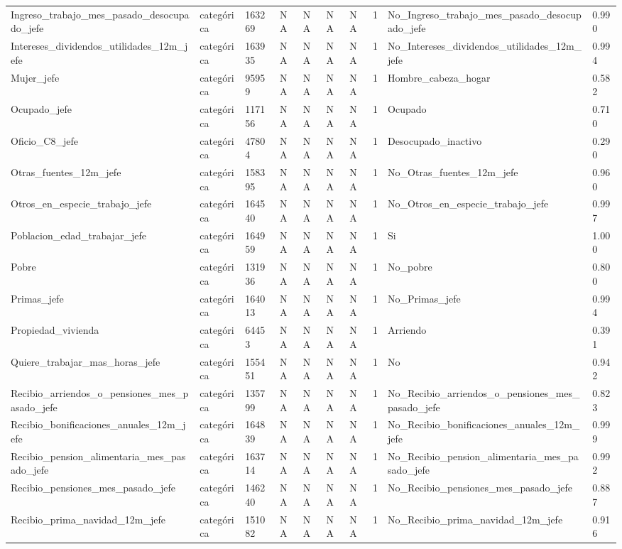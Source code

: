 \begin{longtable}[t]{llllllllll}
Ingreso\_trabajo\_mes\_pasado\_desocupado\_jefe & categórica & 163269 & NA & NA & NA & NA & 1 & No\_Ingreso\_trabajo\_mes\_pasado\_desocupado\_jefe & 0.990\\
Intereses\_dividendos\_utilidades\_12m\_jefe & categórica & 163935 & NA & NA & NA & NA & 1 & No\_Intereses\_dividendos\_utilidades\_12m\_jefe & 0.994\\
Mujer\_jefe & categórica & 95959 & NA & NA & NA & NA & 1 & Hombre\_cabeza\_hogar & 0.582\\
Ocupado\_jefe & categórica & 117156 & NA & NA & NA & NA & 1 & Ocupado & 0.710\\
Oficio\_C8\_jefe & categórica & 47804 & NA & NA & NA & NA & 1 & Desocupado\_inactivo & 0.290\\
Otras\_fuentes\_12m\_jefe & categórica & 158395 & NA & NA & NA & NA & 1 & No\_Otras\_fuentes\_12m\_jefe & 0.960\\
Otros\_en\_especie\_trabajo\_jefe & categórica & 164540 & NA & NA & NA & NA & 1 & No\_Otros\_en\_especie\_trabajo\_jefe & 0.997\\
Poblacion\_edad\_trabajar\_jefe & categórica & 164959 & NA & NA & NA & NA & 1 & Si & 1.000\\
Pobre & categórica & 131936 & NA & NA & NA & NA & 1 & No\_pobre & 0.800\\
Primas\_jefe & categórica & 164013 & NA & NA & NA & NA & 1 & No\_Primas\_jefe & 0.994\\
Propiedad\_vivienda & categórica & 64453 & NA & NA & NA & NA & 1 & Arriendo & 0.391\\
Quiere\_trabajar\_mas\_horas\_jefe & categórica & 155451 & NA & NA & NA & NA & 1 & No & 0.942\\
Recibio\_arriendos\_o\_pensiones\_mes\_pasado\_jefe & categórica & 135799 & NA & NA & NA & NA & 1 & No\_Recibio\_arriendos\_o\_pensiones\_mes\_pasado\_jefe & 0.823\\
Recibio\_bonificaciones\_anuales\_12m\_jefe & categórica & 164839 & NA & NA & NA & NA & 1 & No\_Recibio\_bonificaciones\_anuales\_12m\_jefe & 0.999\\
Recibio\_pension\_alimentaria\_mes\_pasado\_jefe & categórica & 163714 & NA & NA & NA & NA & 1 & No\_Recibio\_pension\_alimentaria\_mes\_pasado\_jefe & 0.992\\
Recibio\_pensiones\_mes\_pasado\_jefe & categórica & 146240 & NA & NA & NA & NA & 1 & No\_Recibio\_pensiones\_mes\_pasado\_jefe & 0.887\\
Recibio\_prima\_navidad\_12m\_jefe & categórica & 151082 & NA & NA & NA & NA & 1 & No\_Recibio\_prima\_navidad\_12m\_jefe & 0.916\\

\end{longtable}
